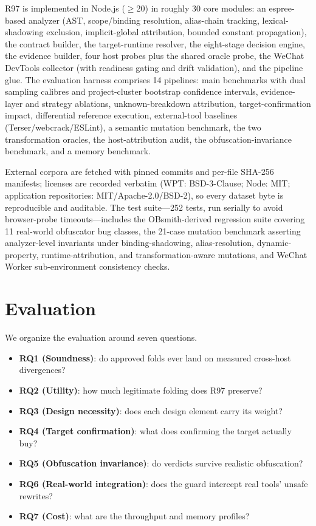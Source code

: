 \documentclass[sigconf,nonacm]{acmart}
\begin{document}
R97 is implemented in Node.js ($\geq$20) in roughly 30 core modules: an espree-based analyzer (AST, scope/binding resolution, alias-chain tracking, lexical-shadowing exclusion, implicit-global attribution, bounded constant propagation), the contract builder, the target-runtime resolver, the eight-stage decision engine, the evidence builder, four host probes plus the shared oracle probe, the WeChat DevTools collector (with readiness gating and drift validation), and the pipeline glue. The evaluation harness comprises 14 pipelines: main benchmarks with dual sampling calibres and project-cluster bootstrap confidence intervals, evidence-layer and strategy ablations, unknown-breakdown attribution, target-confirmation impact, differential reference execution, external-tool baselines (Terser/webcrack/ESLint), a semantic mutation benchmark, the two transformation oracles, the host-attribution audit, the obfuscation-invariance benchmark, and a memory benchmark.

External corpora are fetched with pinned commits and per-file SHA-256 manifests; licenses are recorded verbatim (WPT: BSD-3-Clause; Node: MIT; application repositories: MIT/Apache-2.0/BSD-2), so every dataset byte is reproducible and auditable. The test suite---252 tests, run serially to avoid browser-probe timeouts---includes the OBsmith-derived regression suite covering 11 real-world obfuscator bug classes, the 21-case mutation benchmark asserting analyzer-level invariants under binding-shadowing, alias-resolution, dynamic-property, runtime-attribution, and transformation-aware mutations, and WeChat Worker sub-environment consistency checks.

\section{Evaluation}\label{sec:eval}

We organize the evaluation around seven questions.

\begin{itemize}
  \item \textbf{RQ1 (Soundness)}: do approved folds ever land on measured cross-host divergences?
  \item \textbf{RQ2 (Utility)}: how much legitimate folding does R97 preserve?
  \item \textbf{RQ3 (Design necessity)}: does each design element carry its weight?
  \item \textbf{RQ4 (Target confirmation)}: what does confirming the target actually buy?
  \item \textbf{RQ5 (Obfuscation invariance)}: do verdicts survive realistic obfuscation?
  \item \textbf{RQ6 (Real-world integration)}: does the guard intercept real tools' unsafe rewrites?
  \item \textbf{RQ7 (Cost)}: what are the throughput and memory profiles?
\end{itemize}
\end{document}
